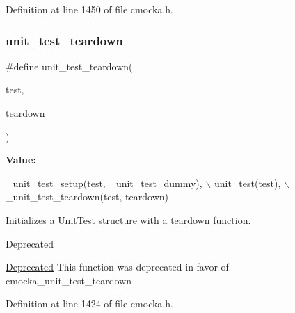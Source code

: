 Definition at line 1450 of file cmocka.\+h.

\mbox{\label{group__cmocka__exec_ga3fe0f3c69fb85843701876937b7217f4}} 
\subsubsection{\texorpdfstring{unit\+\_\+test\+\_\+teardown}{unit\_test\_teardown}}
{\footnotesize\ttfamily \#define unit\+\_\+test\+\_\+teardown(\begin{DoxyParamCaption}\item[{}]{test,  }\item[{}]{teardown }\end{DoxyParamCaption})}

{\bfseries Value\+:}
\begin{DoxyCode}
\_unit\_test\_setup(test, \_unit\_test\_dummy), \(\backslash\)
    unit\_test(test), \(\backslash\)
    \_unit\_test\_teardown(test, teardown)
\end{DoxyCode}
Initializes a \hyperlink{structUnitTest}{Unit\+Test} structure with a teardown function.

\begin{DoxyRefDesc}{Deprecated}
\item[\hyperlink{deprecated__deprecated000003}{Deprecated}]This function was deprecated in favor of cmocka\+\_\+unit\+\_\+test\+\_\+teardown \end{DoxyRefDesc}


Definition at line 1424 of file cmocka.\+h.

